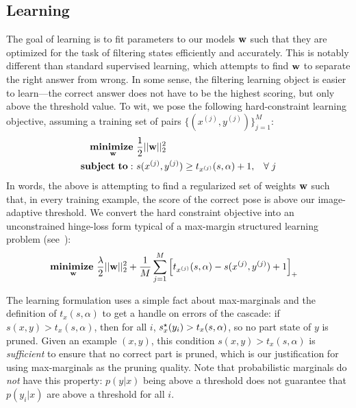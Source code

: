 \subsection{Learning}
The goal of learning is to fit parameters to our models $\mathbf{w}$ such that they are 
optimized for the task of filtering states efficiently and accurately.  This is 
notably different than standard supervised learning, which attempts to find 
$\mathbf{w}$ to separate the right answer from wrong.  In some sense, the filtering 
learning object is easier to learn---the correct answer does not have to be the 
highest scoring, but only above the threshold value.  To wit, we pose the 
following hard-constraint learning objective, assuming a training set of pairs 
$\{(x^{(j)},y^{(j)})\}_{j=1}^M$:
\begin{align}
\mathop{\mathbf{minimize~}}_{\mathbf{w}}& \frac{1}{2} ||\mathbf{w}||_2^2 \\
\mathbf{subject~to:~}& s(x^{(j)},y^{(j)}) \geq t_{x^{(j)}}(s,\alpha) + 1,\;\;\; \forall \; j
\end{align}
In words, the above is attempting to find a regularized set of weights $\mathbf{w}$ 
such that, in every training example, the score of the correct pose is above 
our image-adaptive threshold.  We convert the hard constraint objective into an 
unconstrained hinge-loss form typical of a max-margin structured learning 
problem (see~):
\begin{align}
\mathop{\mathbf{minimize~}}_{\mathbf{w}}& \frac{\lambda}{2} ||\mathbf{w}||_2^2 + \frac{1}{M} \sum_{j=1}^M \left[ 
t_{x^{(j)}}(s,\alpha) - s(x^{(j)},y^{(j)}) + 1 \right]_+
\label{eq:cps-learn-hinge}
\end{align}


The learning formulation uses a simple fact about max-marginals and the 
definition of $t_x(s,\alpha)$
to get a handle on errors of the cascade:
if $s(x,y) > t_x(s,\alpha)$, then for all $i$, $s^\star_x(y_i) >  t_x(s,\alpha)$, so no 
part state of $y$ is pruned.   Given an example $(x,y)$,
this condition $s(x,y) > t_x(s,\alpha)$ is {\em sufficient} to ensure that no 
correct part is pruned, which is our justification for using max-marginals as 
the pruning quality.  Note that probabilistic marginals do {\em not} have this 
property: $p(y|x)$ being above a threshold does not guarantee that $p(y_i|x)$ 
are above a threshold for all $i$.

